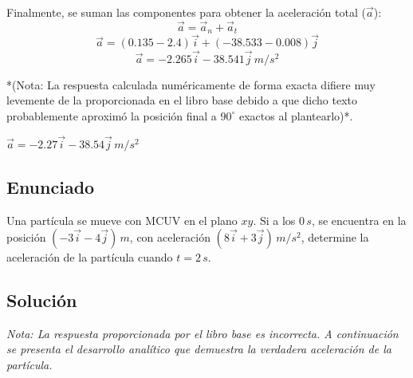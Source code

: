 \documentclass[12pt, a4paper]{article}
\begin{document}
Finalmente, se suman las componentes para obtener la aceleración total ($\vec{a}$):
$$ \vec{a} = \vec{a}_n + \vec{a}_t $$
$$ \vec{a} = (0.135 - 2.4)\vec{i} + (-38.533 - 0.008)\vec{j} $$
$$ \vec{a} = -2.265\vec{i} - 38.541\vec{j} \, \si{m/s^2} $$

*(Nota: La respuesta calculada numéricamente de forma exacta difiere muy levemente de la proporcionada en el libro base debido a que dicho texto probablemente aproximó la posición final a $90^\circ$ exactos al plantearlo)*.

\begin{tcolorbox}[colback=green!5!white, colframe=green!50!black, title=Respuesta Final]
\centering \Large $\vec{a} = -2.27\vec{i} - 38.54\vec{j} \, \si{m/s^2}$
\end{tcolorbox}

\newpage

\subsection*{Enunciado}
Una partícula se mueve con MCUV en el plano $xy$. Si a los $0 \, \si{s}$, se encuentra en la posición $(-3\vec{i} - 4\vec{j}) \, \si{m}$, con aceleración $(8\vec{i} + 3\vec{j}) \, \si{m/s^2}$, determine la aceleración de la partícula cuando $t = 2 \, \si{s}$. 

\begin{center}
\end{center}

\subsection*{Solución}

\textit{Nota: La respuesta proporcionada por el libro base es incorrecta. A continuación se presenta el desarrollo analítico que demuestra la verdadera aceleración de la partícula.}
\end{document}
